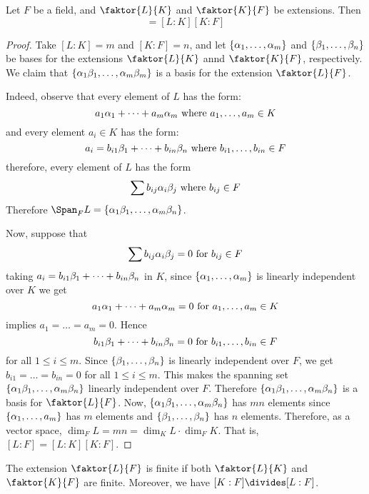 \begin{theorem}\label{theorem_8.2.5}
  Let $F$ be a field, and $\faktor{L}{K}$ and $\faktor{K}{F}$ be
  extensions. Then
  \begin{equation*}
    [L:F]=[L:K][K:F]
  \end{equation*}
\end{theorem}
\begin{proof}
  Take $[L:K]=m$ and $[K:F]=n$, and let $\{ \alpha_1, \dots, \alpha_m\}$ and
  $\{ \beta_1, \dots, \beta_n\}$ be bases for the extensions $\faktor{L}{K}$
  annd $\faktor{K}{F}$, respectively. We claim that $\{\alpha_1\beta_1,
  \dots, \alpha_m\beta_m\}$ is a basis for the extension $\faktor{L}{F}$.

  Indeed, observe that every element of $L$ has the form:
  \begin{equation*}
    a_1\alpha_1+\dots+a_m\alpha_m \text{ where } a_1, \dots, a_m \in K
  \end{equation*}
  and every element $a_i \in K$ has the form:
  \begin{equation*}
    a_i=b_{i1}\beta_1+\dots+b_{in}\beta_n \text{ where } b_{i1}, \dots, b_{in} \in F
  \end{equation*}
  therefore, every element of $L$ has the form
  \begin{equation*}
    \sum{b_{ij}\alpha_i\beta_j} \text{ where } b_{ij} \in F
  \end{equation*}
  Therefore $\Span_F{L}=\{\a_1\b_1, \dots, \a_m\b_n\}$.

  Now, suppose that
  \begin{equation*}
    \sum{b_{ij}\alpha_i\beta_j}=0 \text{ for } b_{ij} \in F
  \end{equation*}
  taking $a_i=b_{i1}\beta_1+\dots+b_{in}\beta_n$ in $K$, since $\{\alpha_1,
  \dots, \alpha_m\}$ is linearly independent over $K$ we get
  \begin{equation*}
    a_1\alpha_1+\dots+a_m\alpha_m=0 \text{ for } a_1, \dots, a_m \in K
  \end{equation*}
  implies $a_1=\dots=a_m=0$. Hence
  \begin{equation*}
    b_{i1}\beta_1+\dots+b_{in}\beta_n=0 \text{ for } b_{i1}, \dots, b_{in} \in F
  \end{equation*}
  for all $1 \leq i \leq m$. Since $\{\beta_1, \dots, \beta_n\}$ is
  linearly independent over $F$, we get $b_{i1}=\dots=b_{in}=0$ for
  all $1 \leq i \leq m$. This makes the spanning set $\{\alpha_1\beta_1,
  \dots, \alpha_m\beta_n\}$ linearly independent over $F$. Therefore
  $\{\alpha_1\beta_1, \dots, \alpha_m\beta_n\}$ is a basis for $\faktor{L}{F}$. Now,
  $\{\alpha_1\beta_1, \dots, \alpha_m\beta_n\}$ has $mn$ elements since $\{\alpha_1,
  \dots, a_m\}$ has $m$ elements and  $\{\beta_1, \dots, \beta_n\}$ has $n$
  elements. Therefore, as a vector space, $\dim_F{L}=mn=\dim_K{L} \cdot
  \dim_F{K}$. That is, $[L:F]=[L:K][K:F]$.
\end{proof}
\begin{corollary}
  The extension $\faktor{L}{F}$ is finite if both $\faktor{L}{K}$ and
  $\faktor{K}{F}$ are finite. Moreover, we have $[K:F] \divides
  [L:F]$.
\end{corollary}


